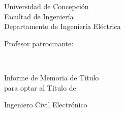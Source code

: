\thispagestyle{empty}
\begin{minipage}{8cm}
\begin{flushleft}
\begin{large}
\noindent Universidad de Concepción\\
Facultad de Ingeniería\\
Departamento de Ingeniería Eléctrica\\[2cm]
\end{large}
\end{flushleft}
\end{minipage}
\hfill
\begin{minipage}{8cm}
\begin{flushright}
\begin{large}
\noindent Profesor patrocinante:\\[0.5em]
\makeatletter
\@ProfPatrocinante
\makeatother
\end{large}
\end{flushright}
\end{minipage}

\vspace*{6cm}

\begin{center}

\makeatletter
{\Huge\@title \par}%
\makeatother
\vspace*{\fill}
{\Large{\textbf{\Author}}}\\[1.6cm]
{\Large{Informe de Memoria de Título\\ para optar al Título de}\par}
\vspace{1cm}
{\Large Ingeniero Civil Electrónico}
\vfill
{\Large \monthname\ \the\year}
\end{center}
\ifdefined\NoBgThispage
\NoBgThispage
\fi
\newpage